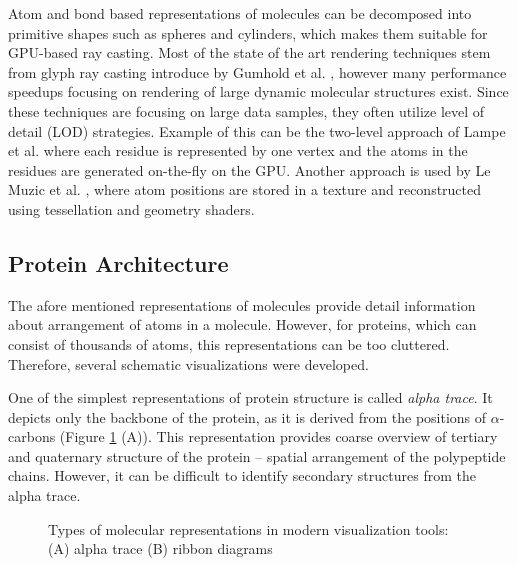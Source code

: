 Atom and bond based representations of molecules can be decomposed into primitive shapes such as spheres and cylinders, which makes them suitable for GPU-based ray casting. Most of the state of the art rendering techniques stem from glyph ray casting introduce by Gumhold et al. \cite{gumhold2003splatting}, however many performance speedups focusing on rendering of large dynamic molecular structures exist. Since these techniques are focusing on large data samples, they often utilize level of detail (LOD) strategies. Example of this can be the two-level approach of Lampe et al. \cite{lampe2007two} where each residue is represented by one vertex and the atoms in the residues are generated on-the-fly on the GPU. Another approach is used by Le Muzic et al. \cite{le2014illustrative}, where atom positions are stored in a texture and reconstructed using tessellation and geometry shaders.

\subsection{Protein Architecture}
The afore mentioned representations of molecules provide detail information about arrangement of atoms in a molecule. However, for proteins, which can consist of thousands of atoms, this representations can be too cluttered. Therefore, several schematic visualizations were developed.

One of the simplest representations of protein structure is called \textit{alpha trace}. It depicts only the backbone of the protein, as it is derived from the positions of $\alpha$-carbons (Figure \ref{Fig:vis2} (A)). This representation provides coarse overview of tertiary and quaternary structure of the protein -- spatial arrangement of the polypeptide chains. However, it can be difficult to identify secondary structures from the alpha trace.
\vspace{-10pt}

\begin{figure}[H]
  \centering
  \vspace{-10pt}
  \caption{Types of molecular representations in modern visualization tools: (A) alpha trace (B) ribbon diagrams}
  \label{Fig:vis2}  
\end{figure} 

